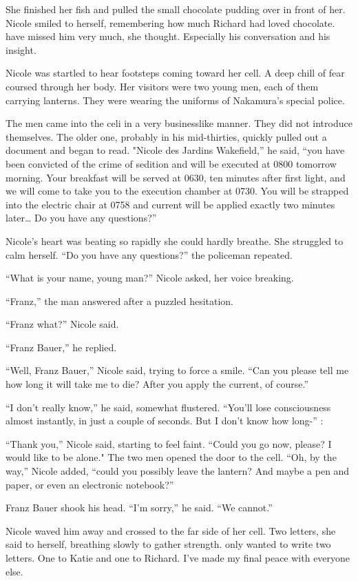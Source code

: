 \documentclass[]{article}
\begin{document}
{{She finished her fish and pulled the small chocolate pudding over in front of her.  Nicole smiled to herself, remembering how much Richard had loved chocolate.  have missed him very much, she thought.  Especially his conversation and his insight.

Nicole was startled to hear footsteps coming toward her cell.  A deep chill of fear coursed through her body.  Her visitors were two young men, each of them carrying lanterns.  They were wearing the uniforms of Nakamura’s special police.

The men came into the celi in a very businesslike manner.  They did not introduce themselves.  The older one, probably in his mid-thirties, quickly pulled out a document and began to read.  "Nicole des Jardins Wakefield,” he said, “you have been convicted of the crime of sedition and will be executed at 0800 tomorrow morning.  Your breakfast will be served at 0630, ten minutes after first light, and we will come to take you to the execution chamber at 0730.  You will be strapped into the electric chair at 0758 and current will be applied exactly two minutes later… Do you have any questions?”

Nicole’s heart was beating so rapidly she could hardly breathe.  She struggled to calm herself.  “Do you have any questions?” the policeman repeated.

“What is your name, young man?” Nicole asked, her voice breaking.

“Franz,” the man answered after a puzzled hesitation.

“Franz what?” Nicole said.

“Franz Bauer,” he replied.

“Well, Franz Bauer,” Nicole said, trying to force a smile.  “Can you please tell me how long it will take me to die? After you apply the current, of course.”

“I don’t really know,” he said, somewhat flustered.  “You’ll lose consciousness almost instantly, in just a couple of seconds.  But I don’t know how long-” :

“Thank you,” Nicole said, starting to feel faint.  “Could you go now, please? I would like to be alone."  The two men opened the door to the cell.  “Oh, by the way,” Nicole added, “could you possibly leave the lantern? And maybe a pen and paper, or even an electronic notebook?”

Franz Bauer shook his head.  “I’m sorry,” he said.  “We cannot.”

Nicole waved him away and crossed to the far side of her cell.  Two letters, she said to herself, breathing slowly to gather strength.  only wanted to write two letters.  One to Katie and one to Richard.  I’ve made my final peace with everyone else.

}}
\end{document}
